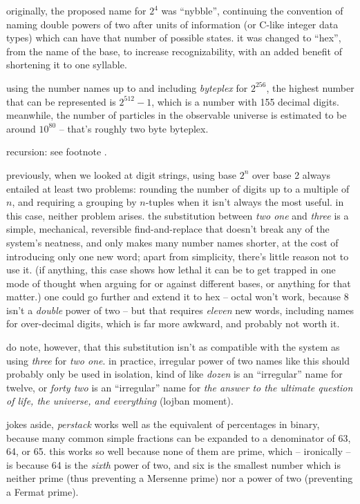 \documentclass[../footnotes.tex]{subfiles}
\begin{document}
\myfootnote{} originally, the proposed name for $2^4$ was ``nybble'', continuing the convention of naming double powers of two after units of information (or C-like integer data types) which can have that number of possible states. it was changed to ``hex'', from the name of the base, to increase recognizability, with an added benefit of shortening it to one syllable.

\myfootnote{} using the number names up to and including {\it byteplex} for $2^{256}$, the highest number that can be represented is $2^{512} - 1$, which is a number with 155 decimal digits. meanwhile, the number of particles in the observable universe is estimated to be around $10^{80}$ -- that's roughly two byte byteplex.

\myfootnote{} recursion: see footnote \recursivefootnote.

\myfootnote{} previously, when we looked at digit strings, using base $2^n$ over base 2 always entailed at least two problems: rounding the number of digits up to a multiple of $n$, and requiring a grouping by $n$-tuples when it isn't always the most useful. in this case, neither problem arises. the substitution between {\it two one} and {\it three} is a simple, mechanical, reversible find-and-replace that doesn't break any of the system's neatness, and only makes many number names shorter, at the cost of introducing only one new word; apart from simplicity, there's little reason not to use it. (if anything, this case shows how lethal it can be to get trapped in one mode of thought when arguing for or against different bases, or anything for that matter.) one could go further and extend it to hex -- octal won't work, because 8 isn't a \emph{double} power of two -- but that requires \emph{eleven} new words, including names for over-decimal digits, which is far more awkward, and probably not worth it.

\myfootnote{} do note, however, that this substitution isn't as compatible with the system as using {\it three} for {\it two one}. in practice, irregular power of two names like this should probably only be used in isolation, kind of like {\it dozen} is an ``irregular'' name for twelve, or {\it forty two} is an ``irregular'' name for {\it the answer to the ultimate question of life, the universe, and everything} (lojban moment).

\myfootnote{} jokes aside, {\it perstack} works well as the equivalent of percentages in binary, because many common simple fractions can be expanded to a denominator of 63, 64, or 65. this works so well because none of them are prime, which -- ironically -- is because 64 is the \emph{sixth} power of two, and six is the smallest number which is neither prime (thus preventing a Mersenne prime) nor a power of two (preventing a Fermat prime).
\end{document}
